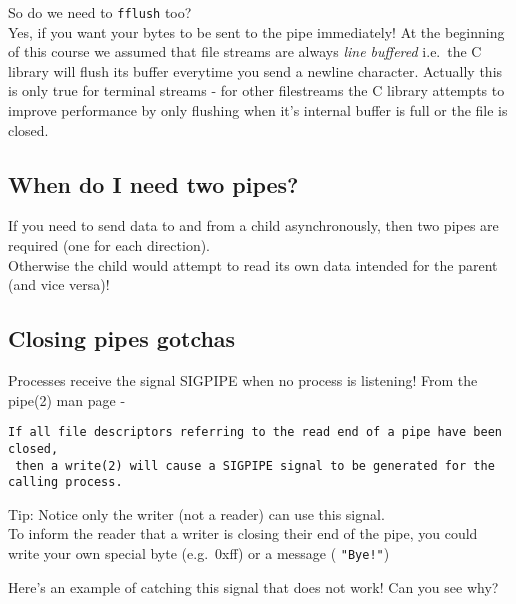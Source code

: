 So do we need to \texttt{fflush} too?\\Yes, if you want your bytes to be
sent to the pipe immediately! At the beginning of this course we assumed
that file streams are always \emph{line buffered} i.e.~the C library
will flush its buffer everytime you send a newline character. Actually
this is only true for terminal streams - for other filestreams the C
library attempts to improve performance by only flushing when it's
internal buffer is full or the file is closed.

\subsection{When do I need two pipes?}\label{when-do-i-need-two-pipes}

If you need to send data to and from a child asynchronously, then two
pipes are required (one for each direction).\\Otherwise the child would
attempt to read its own data intended for the parent (and vice versa)!

\subsection{Closing pipes gotchas}\label{closing-pipes-gotchas}

Processes receive the signal SIGPIPE when no process is listening! From
the pipe(2) man page -

\begin{verbatim}
If all file descriptors referring to the read end of a pipe have been closed,
 then a write(2) will cause a SIGPIPE signal to be generated for the calling process. 
\end{verbatim}

Tip: Notice only the writer (not a reader) can use this signal.\\To
inform the reader that a writer is closing their end of the pipe, you
could write your own special byte (e.g.~0xff) or a message (
\texttt{"Bye!"})

Here's an example of catching this signal that does not work! Can you
see why?

